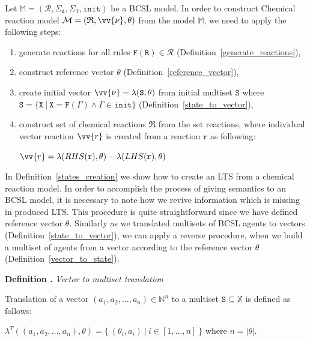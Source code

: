 \documentclass[12pt]{fithesis2}
\newcounter{counter}[section]
\renewcommand{\thecounter}{\thesection.\arabic{counter}}
\newenvironment{definition}[1]{\bigskip\refstepcounter{counter}\noindent\textbf{Definition \thecounter } \textit{#1} \par\nopagebreak}{\bigskip}
\begin{document}
Let $\mathds{M} = (\mathcal{R}, \Sigma_\mathtt{A}, \Sigma_\mathtt{T}, \mathtt{init})$ be a BCSL model. In order to construct Chemical reaction model $\mathcal{M} = (\mathfrak{R}, \vv{\nu}, \theta)$ from the model $\mathds{M}$, we need to apply the following steps:

\begin{enumerate}
\item generate reactions for all rules $\mathtt{F}(\mathtt{R}) \in \mathcal{R}$ (Definition~\ref{generate_reactions}),
\item construct reference vector $\theta$ (Definition~\ref{reference_vector}),
\item create initial vector $\vv{\nu} = \lambda(\mathtt{S}, \theta)$ from initial multiset $\mathtt{S}$ where $\mathtt{S} = \{ \mathtt{X} ~|~ \mathtt{X} = \mathtt{F}(\Gamma) \wedge \Gamma \in \mathtt{init} \}$ (Definition~\ref{state_to_vector}),
\item construct set of chemical reactions $\mathfrak{R}$ from the set reactions, where individual vector reaction $\vv{r}$ is created from a reaction $\mathtt{r}$ as following:

\begin{center}
$\vv{r} = \lambda(RHS(\mathtt{r}), \theta) - \lambda(LHS(\mathtt{r}), \theta)$
\end{center}

\end{enumerate}

In Definition~\ref{states_creation} we show how to create an LTS from a chemical reaction model. In order to accomplish the process of giving semantics to an BCSL model, it is necessary to note how we revive information which is missing in produced LTS. This procedure is quite straightforward since we have defined reference vector $\theta$. Similarly as we translated multisets of BCSL agents to vectors (Definition~\ref{state_to_vector}), we can apply a reverse procedure, when we build a multiset of agents from a vector according to the reference vector $\theta$ (Definition~\ref{vector_to_state}).

\begin{definition}{Vector to multiset translation}
\label{vector_to_state}

Translation of a vector $(a_1, a_2, \ldots, a_n) \in \mathbb{N}^n$ to a multiset $\mathtt{S} \subseteq \mathds{X}$ is defined as follows:

\begin{center}
$\lambda^T((a_1, a_2, \ldots, a_n), \theta) = \{~ (\theta_i, a_i) ~|~ i \in [1, \ldots, n] ~\} $ where $n = |\theta|$.
\end{center}
\end{definition}
\end{document}
